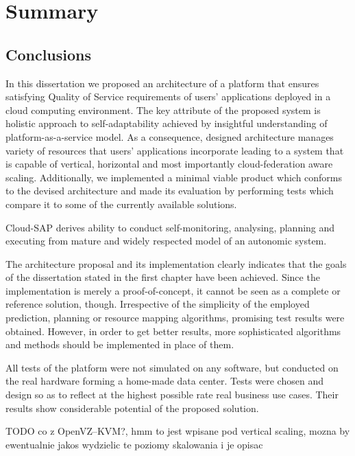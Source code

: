 \chapter{Summary}


\section{Conclusions}
In this dissertation we proposed an architecture of a platform that ensures satisfying Quality of Service requirements of users' applications deployed in a cloud computing environment. The key attribute of the proposed system is holistic approach to self-adaptability achieved by insightful understanding of platform-as-a-service model. As a consequence, designed architecture manages variety of resources that users' applications incorporate leading to a system that is capable of vertical, horizontal and most importantly cloud-federation aware scaling. Additionally, we implemented a minimal viable product which conforms to the devised architecture and made its evaluation by performing tests which compare it to some of the currently available solutions.

Cloud-SAP derives ability to conduct self-monitoring, analysing, planning and executing from mature and widely respected model of an autonomic system. 

The architecture proposal and its implementation clearly indicates that the goals of the dissertation stated in the first chapter have been achieved. Since the implementation is merely a proof-of-concept, it cannot be seen as a complete or reference solution, though. Irrespective of the simplicity of the employed prediction, planning or resource mapping algorithms, promising test results were obtained. However, in order to get better results, more sophisticated algorithms and methods should be implemented in place of them.

All tests of the platform were not simulated on any software, but conducted on the real hardware forming a home-made data center. Tests were chosen and design so as to reflect at the highest possible rate real business use cases. Their results show considerable potential of the proposed solution.


TODO co z OpenVZ--KVM?, hmm to jest wpisane pod vertical scaling, mozna by ewentualnie jakos wydzielic te poziomy skalowania i je opisac

